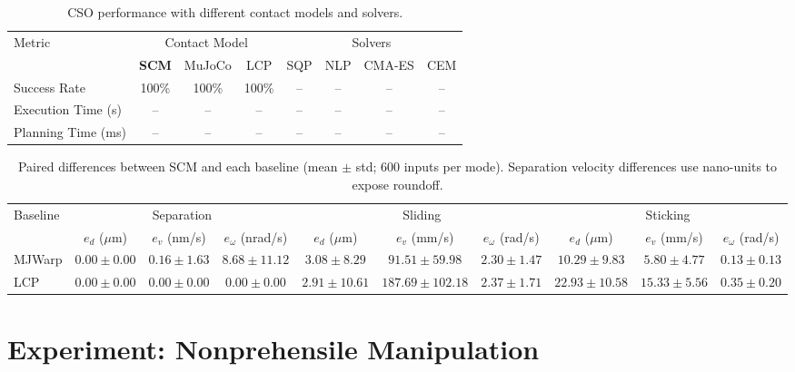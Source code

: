 \begin{table}[t]
\centering
\caption{CSO performance with different contact models and solvers.}
\label{tab:cso_contact_guidance}
\scriptsize
\setlength{\tabcolsep}{2pt}
\begin{tabular}{@{}l*{7}{c}@{}}
\toprule
\multirow{2}{*}{Metric} & \multicolumn{3}{c}{Contact Model} & \multicolumn{4}{c}{Solvers} \\
\cmidrule(lr){2-4}\cmidrule(lr){5-8}
 & \textbf{SCM} & MuJoCo & LCP & SQP & NLP & CMA-ES & CEM \\
\midrule
Success Rate & 100\% & 100\% & 100\% & -- & -- & -- & -- \\
Execution Time (s) & -- & -- & -- & -- & -- & -- & -- \\
Planning Time (ms) & -- & -- & -- & -- & -- & -- & -- \\
\bottomrule
\end{tabular}
\end{table}

\begin{table}[t]
\centering
\caption{Paired differences between SCM and each baseline (mean $\pm$ std; 600 inputs per mode). Separation velocity differences use nano-units to expose roundoff.}
\label{tab:scm_lcp_accuracy}
\scriptsize
\setlength{\tabcolsep}{2pt}
\renewcommand{\arraystretch}{0.95}
\begin{tabular}{@{}l*{9}{c}@{}}
\toprule
\multirow{2}{*}{Baseline} & \multicolumn{3}{c}{Separation} & \multicolumn{3}{c}{Sliding} & \multicolumn{3}{c}{Sticking} \\
\cmidrule(lr){2-4}\cmidrule(lr){5-7}\cmidrule(lr){8-10}
 & $e_d$ ($\mu$m) & $e_v$ (nm/s) & $e_\omega$ (nrad/s) & $e_d$ ($\mu$m) & $e_v$ (mm/s) & $e_\omega$ (rad/s) & $e_d$ ($\mu$m) & $e_v$ (mm/s) & $e_\omega$ (rad/s) \\
\midrule
MJWarp & $0.00 \pm 0.00$ & $0.16 \pm 1.63$ & $8.68 \pm 11.12$ & $3.08 \pm 8.29$ & $91.51 \pm 59.98$ & $2.30 \pm 1.47$ & $10.29 \pm 9.83$ & $5.80 \pm 4.77$ & $0.13 \pm 0.13$ \\
LCP & $0.00 \pm 0.00$ & $0.00 \pm 0.00$ & $0.00 \pm 0.00$ & $2.91 \pm 10.61$ & $187.69 \pm 102.18$ & $2.37 \pm 1.71$ & $22.93 \pm 10.58$ & $15.33 \pm 5.56$ & $0.35 \pm 0.20$ \\
\bottomrule
\end{tabular}
\end{table}


\section{Experiment: Nonprehensile Manipulation}
\label{sec:experiment}

